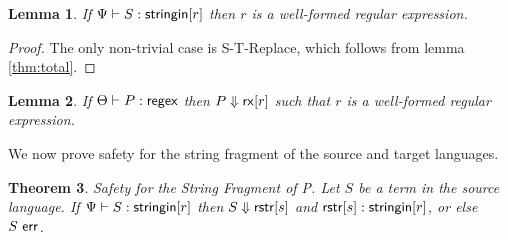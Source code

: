 \documentclass{acm_proc_article-sp}
\newtheorem{thm}{Theorem}
\newtheorem{lem}[thm]{Lemma}
\theoremstyle{definition}
\newcommand{\stringin}[1]{{\sf stringin}[#1]}
\newcommand{\rx}[1]{ {\sf rx}[#1] }
\newcommand{\regex}{{\sf regex}}
\newcommand{\err}{\ {\sf err}}
\newcommand{\treduces}{ \Downarrow }
\newcommand{\sreduces}{ \Downarrow }
\begin{document}
\begin{lem}
  If $\sctx \vdash S : \stringin{r}$ then $r$ is a well-formed regular expression.
\end{lem}
\begin{proof}
  The only non-trivial case is S-T-Replace, which follows from lemma \ref{thm:total}. 
\end{proof}
\begin{lem}
If $\tctx \vdash P : \regex$ then $P \treduces \rx{r}$ such that $r$ is a well-formed regular expression. 
\end{lem}

We now prove safety for the string fragment of the source and target languages.

\begin{thm}{Safety for the String Fragment of P.}
  Let $S$ be a term in the source language. If $\sctx \vdash S : \stringin{r}$ 
  then $S \sreduces \rstr{s}$ and $\rstr{s} : \stringin{r}$, or else $S \err$.
\end{thm}
\end{document}
